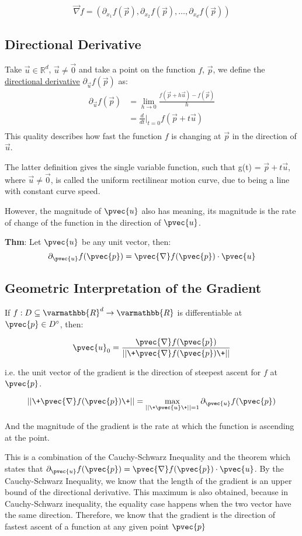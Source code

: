 \documentclass[11 pt, twoside]{article}
\begin{document}
$$\vec{\nabla}f = (\partial_{x_1} f(\vec{p}), \partial_{x_2} f(\vec{p}), \dots, \partial_{x_d}f(\vec{p}))$$

\subsection{Directional Derivative}

Take $\vec{u} \in \mathbb{R}^d$, $\vec{u} \neq \vec{0}$ and take a point on the function $f$, $\vec{p}$, we define the \underline{directional derivative}
$\partial_{\vec{u}}f(\vec{p})$ as:
\begin{align*}
\partial_{\vec{u}}f(\vec{p}) &= \lim_{h\to0} \frac{f(\vec{p} + h\vec{u}) - f(\vec{p})}{h}\\
&= \frac{d}{dt}\big|_{t=0} f(\vec{p} + t\vec{u})\\
\end{align*}
This quality describes how fast the function $f$ is changing at $\vec{p}$ in the direction of $\vec{u}$.

The latter definition gives the single variable function, such that g(t) = $\vec{p} + t\vec{u}$, where $\vec{u} \neq \vec{0}$, is called the uniform rectilinear motion curve, due to being a line with constant curve speed.

However, the magnitude of $\pvec{u}$ also has meaning, its magnitude is the rate
of change of the function in the direction of $\pvec{u}$.

\textbf{Thm}: Let $\pvec{u}$ be any unit vector, then:
$$\partial_{\pvec{u}}f(\pvec{p}) = \pvec{\nabla}f(\pvec{p}) \cdot \pvec{u}$$

\subsection{Geometric Interpretation of the Gradient}
If $f: D \subseteq \varmathbb{R}^d \to \varmathbb{R}$ is differentiable at
$\pvec{p} \in D^\circ$, then:

$$\pvec{u}_0 = \frac{\pvec{\nabla}f(\pvec{p})}{||\+\pvec{\nabla}f(\pvec{p})\+||}$$

i.e. the unit vector of the gradient is the direction of steepest ascent for $f$
at $\pvec{p}$.

$$||\+\pvec{\nabla}f(\pvec{p})\+|| = \max_{||\+\pvec{u}\+|| = 1}
\partial_{\pvec{u}}f(\pvec{p})$$

And the magnitude of the gradient is the rate at which the function is ascending
at the point.

This is a combination of the Cauchy-Schwarz Inequality and the theorem which states that
$\partial_{\pvec{u}}f(\pvec{p}) = \pvec{\nabla}f(\pvec{p}) \cdot \pvec{u}$.
By the Cauchy-Schwarz Inequality, we know that the length of the gradient is an
upper bound of the directional derivative. This maximum is also obtained,
because in Cauchy-Schwarz inequality, the equality case happens when the two
vector have the same direction. Therefore, we know that the gradient is the direction of
fastest ascent of a function at any given point $\pvec{p}$
\end{document}
